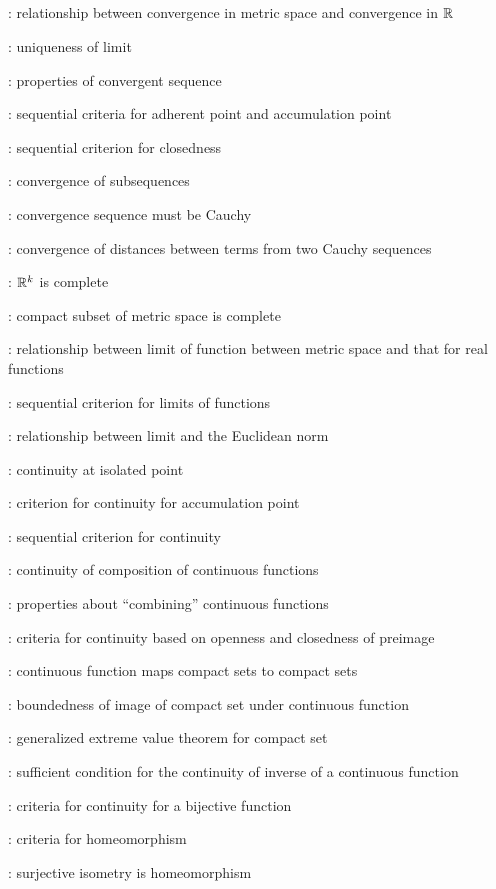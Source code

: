\subsection*{}
\item {}: relationship between convergence in metric space and convergence in \(\mathbb{R}\)
\item {}: uniqueness of limit
\item {}: properties of convergent sequence
\item {}: sequential criteria for adherent point and accumulation point
\item {}: sequential criterion for closedness
\item {}: convergence of subsequences
\item {}: convergence sequence must be Cauchy
\item {}: convergence of distances between terms from two Cauchy sequences
\item {}: \(\mathbb{R}^k\) is complete
\item {}: compact subset of metric space is complete
\item {}: relationship between limit of function between metric space and that for real functions
\item {}: sequential criterion for limits of functions
\item {}: relationship between limit and the Euclidean norm
\item {}: continuity at isolated point
\item {}: criterion for continuity for accumulation point
\item {}: sequential criterion for continuity
\item {}: continuity of composition of continuous functions
\item {}: properties about ``combining'' continuous functions
\item {}: criteria for continuity based on openness and closedness of preimage
\item {}: continuous function maps compact sets to compact sets
\item {}: boundedness of image of compact set under continuous function
\item {}: generalized extreme value theorem for compact set
\item {}: sufficient condition for the continuity of
inverse of a continuous function
\item {}: criteria for continuity for a bijective function
\item {}: criteria for homeomorphism
\item {}: surjective isometry is homeomorphism
